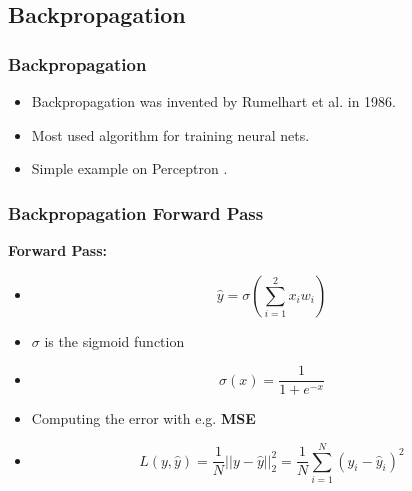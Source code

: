  \subsection{Backpropagation}
  \begin{frame}
   \frametitle{Backpropagation}
   
   \begin{itemize}
    \item<1-> Backpropagation was invented by Rumelhart et al. \cite{Rumelhart1986} in 1986.
    \item<2-> Most used algorithm for training neural nets.
    \item<3-> Simple example on Perceptron \cite{Rosenblatt1957}.
   \end{itemize}      
   
  \end{frame}
  \begin{frame}
   \frametitle{Backpropagation Forward Pass}
   
   \textbf{Forward Pass:}
   \begin{itemize}
    \item<2->{
     \begin{equation}
      \hat{y} = \sigma(\sum_{i=1}^{2}x_iw_i)
     \end{equation}         
    }
    \item<3-> $\sigma$ is the sigmoid function
    \item<4->{
     \begin{equation}
      \sigma(x) = \frac{1}{1+e^{-x}}
     \end{equation}
    }
    \item<5-> Computing the error with e.g. \textbf{MSE}
    \item<6->{
    \begin{equation}
     L(y,\hat{y}) = \frac{1}{N}||y-\hat{y}||_2^2 = \frac{1}{N}\sum_{i=1}^N(y_i-\hat{y}_i)^2
    \end{equation}        
    }
   \end{itemize}    
  
  \end{frame}
